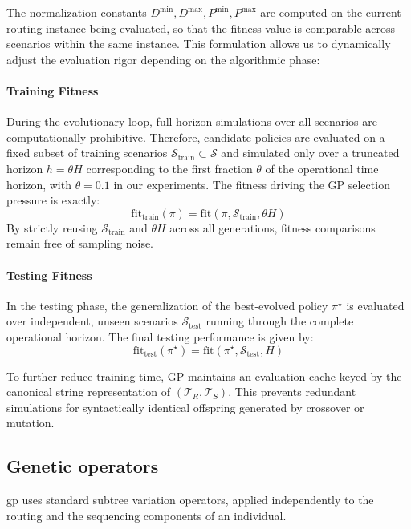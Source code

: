 \documentclass[pdflatex]{sn-jnl}
\begin{document}
The normalization constants $D^{\min}, D^{\max}, P^{\min}, P^{\max}$ are computed on
the current routing instance being evaluated, so that the fitness value is comparable
across scenarios within the same instance. This formulation allows us to dynamically adjust the evaluation rigor depending on the algorithmic phase:

\paragraph{Training Fitness} During the evolutionary loop, full-horizon simulations over all scenarios are computationally prohibitive. Therefore, candidate policies are evaluated on a fixed subset of training scenarios $\mathcal{S}_{\text{train}} \subset \mathcal{S}$ and simulated only over a truncated horizon $h = \theta H$ corresponding to the first fraction $\theta$ of the operational time horizon, with $\theta = 0.1$ in our experiments. The fitness driving the GP selection pressure is exactly:
$$
\mathrm{fit}_{\text{train}}(\pi) = \mathrm{fit}(\pi, \mathcal{S}_{\text{train}}, \theta H)
$$
By strictly reusing $\mathcal{S}_{\text{train}}$ and $\theta H$ across all generations, fitness comparisons remain free of sampling noise.

\paragraph{Testing Fitness} In the testing phase, the generalization of the best-evolved policy $\pi^\star$ is evaluated over independent, unseen scenarios $\mathcal{S}_{\text{test}}$ running through the complete operational horizon. The final testing performance is given by:
$$
\mathrm{fit}_{\text{test}}(\pi^\star) = \mathrm{fit}(\pi^\star, \mathcal{S}_{\text{test}}, H)
$$

To further reduce training time, GP maintains an evaluation cache keyed by the canonical string representation of $(\mathcal{T}_R, \mathcal{T}_S)$. This prevents redundant simulations for syntactically identical offspring generated by crossover or mutation.


\subsection{Genetic operators} \label{subsec:operators}

\gls{gp} uses standard subtree variation operators, applied independently
to the routing and the sequencing components of an individual.
\end{document}
